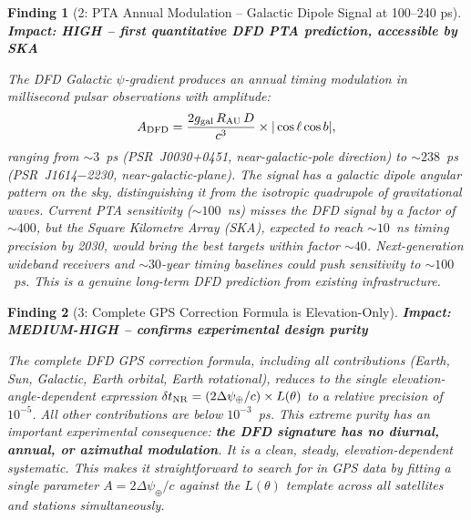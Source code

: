 \documentclass[aps,prd,twocolumn,superscriptaddress,nofootinbib]{revtex4-2}
\newcommand{\deltaT}{\delta t_{\rm NR}}
\newtheorem{finding}{Finding}
\begin{document}
\begin{finding}[2: PTA Annual Modulation -- Galactic Dipole Signal at 100--240 ps]
\label{find:2}
\textbf{Impact: HIGH -- first quantitative DFD PTA prediction, accessible by SKA}

The DFD Galactic $\psi$-gradient produces an annual timing modulation
in millisecond pulsar observations with amplitude:
\begin{equation}
A_{\rm DFD} = \frac{2g_{\rm gal}\,R_{\rm AU}\,D}{c^3}
  \times|\cos\ell\cos b|,
\end{equation}
ranging from $\sim 3$~ps (PSR~J0030+0451, near-galactic-pole direction)
to $\sim 238$~ps (PSR~J1614$-$2230, near-galactic-plane). The signal
has a \emph{galactic dipole} angular pattern on the sky, distinguishing
it from the isotropic quadrupole of gravitational waves. Current PTA
sensitivity ($\sim 100$~ns) misses the DFD signal by a factor of $\sim 400$,
but the Square Kilometre Array (SKA), expected to reach $\sim 10$~ns
timing precision by 2030, would bring the best targets within
factor $\sim 40$. Next-generation wideband receivers and
$\sim 30$-year timing baselines could push sensitivity to $\sim 100$~ps.
This is a genuine long-term DFD prediction from existing infrastructure.
\end{finding}

\begin{finding}[3: Complete GPS Correction Formula is Elevation-Only]
\label{find:3}
\textbf{Impact: MEDIUM-HIGH -- confirms experimental design purity}

The complete DFD GPS correction formula, including all contributions
(Earth, Sun, Galactic, Earth orbital, Earth rotational), reduces to
the single elevation-angle-dependent expression
$\deltaT = (2\Delta\psi_\oplus/c)\times L(\theta)$
to a relative precision of $10^{-5}$. All other contributions are
below $10^{-3}$~ps. This extreme purity has an important experimental
consequence: \textbf{the DFD signature has no diurnal, annual, or azimuthal
modulation}. It is a clean, steady, elevation-dependent systematic.
This makes it straightforward to search for in GPS data by fitting
a single parameter $A = 2\Delta\psi_\oplus/c$ against the $L(\theta)$
template across all satellites and stations simultaneously.
\end{finding}
\end{document}
